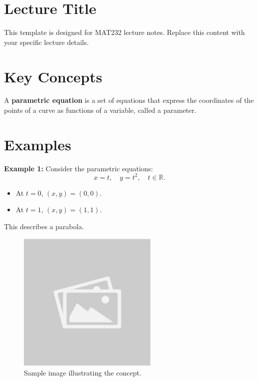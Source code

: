 \documentclass{article}
\begin{document}
\renewcommand{\familydefault}{\rmdefault}


\pagebreak
\normalsize

\section*{Lecture Title}
\begin{notebox}
This template is designed for MAT232 lecture notes. Replace this content with your specific lecture details.
\end{notebox}

\section*{Key Concepts}
\begin{definitionbox}
A \textbf{parametric equation} is a set of equations that express the coordinates of the points of a curve as functions of a variable, called a parameter.
\end{definitionbox}

\section*{Examples}
\begin{examplebox}
\textbf{Example 1:} Consider the parametric equations:
\[ x = t, \quad y = t^2, \quad t \in \mathbb{R}. \]
\begin{itemize}
    \item At $t = 0$, $(x, y) = (0, 0)$.
    \item At $t = 1$, $(x, y) = (1, 1)$.
\end{itemize}
This describes a parabola.
\end{examplebox}

\begin{figure}[H]
    \centering
    \includegraphics[width=0.6\textwidth]{sample_image.jpg}
    \caption{Sample image illustrating the concept.}
    \label{fig:sample_image}
\end{figure}
\end{document}
